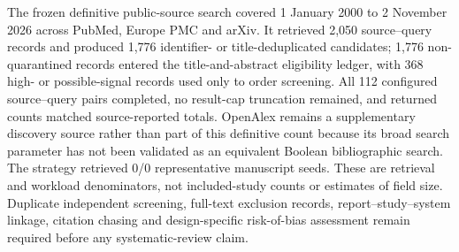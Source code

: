 The frozen definitive public-source search covered 1 January 2000 to 2 November 2026 across PubMed, Europe PMC and arXiv. It retrieved 2,050 source--query records and produced 1,776 identifier- or title-deduplicated candidates; 1,776 non-quarantined records entered the title-and-abstract eligibility ledger, with 368 high- or possible-signal records used only to order screening. All 112 configured source--query pairs completed, no result-cap truncation remained, and returned counts matched source-reported totals. OpenAlex remains a supplementary discovery source rather than part of this definitive count because its broad search parameter has not been validated as an equivalent Boolean bibliographic search. The strategy retrieved 0/0 representative manuscript seeds. These are retrieval and workload denominators, not included-study counts or estimates of field size. Duplicate independent screening, full-text exclusion records, report--study--system linkage, citation chasing and design-specific risk-of-bias assessment remain required before any systematic-review claim.
